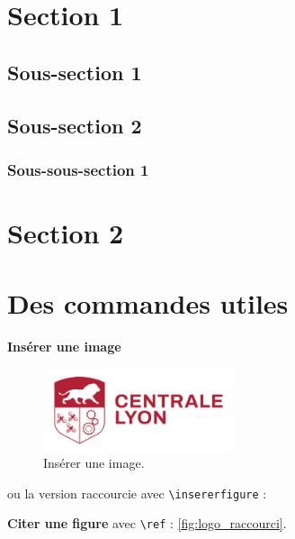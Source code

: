 \documentclass{rapportECL2024}
\begin{document}
\fairepagedegarde
\fairetabledesmatieres


\section{Section 1}
\lipsum[1]


\subsection{Sous-section 1}
\lipsum[2]

\subsection{Sous-section 2}
\lipsum[3]

\subsubsection{Sous-sous-section 1}
\lipsum[4]

\section{Section 2}
\lipsum[5]

\section{Des commandes utiles}

\textbf{Insérer une image}
\begin{figure}[H]
    \centering
    \includegraphics[width=0.5\textwidth]{logos/logo.png}
    \caption{Insérer une image.}
    \label{fig:logo}
\end{figure}

ou la version raccourcie avec \texttt{\textbackslash insererfigure} : 


\textbf{Citer une figure} avec \texttt{\textbackslash ref} : \ref{fig:logo_raccourci}.\\
\end{document}
